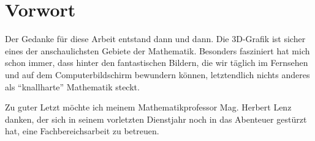 \chapter{Vorwort}

Der Gedanke für diese Arbeit entstand dann und dann. Die 3D-Grafik ist sicher eines der anschaulichsten Gebiete der Mathematik. Besonders fasziniert hat mich schon immer, dass hinter den fantastischen Bildern, die wir täglich im Fernsehen und auf dem Computerbildschirm bewundern können, letztendlich nichts anderes als \enquote{knallharte} Mathematik steckt.

Zu guter Letzt möchte ich meinem Mathematikprofessor Mag. Herbert Lenz danken, der sich in seinem vorletzten Dienstjahr noch in das Abenteuer gestürzt hat, eine Fachbereichsarbeit zu betreuen.